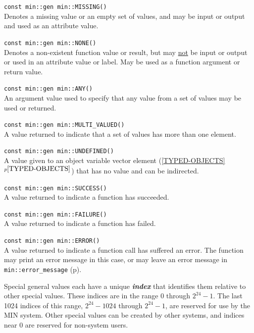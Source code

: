 \documentclass[12pt]{article}
\makeatletter
\newcommand{\ikey}[2]{{\bf \em #1}\index{#2}}
\newcommand{\ttindex}[1]{\index{#1@{\tt #1}}}
\newcommand{\minindex}[1]{\ttindex{min::#1}\ttindex{#1}}
\newcommand{\itemref}[1]{\ref{#1}$^{p\pageref{#1}}$}
\newcommand{\pagref}[1]{p\pageref{#1}}
\newcommand{\EOL}{\penalty \exhyphenpenalty}
\newenvironment{indpar}[1][0.3in]%
	{\begin{list}{}%
		     {\setlength{\itemsep}{0in}%
		      \setlength{\topsep}{0in}%
		      \setlength{\parsep}{1ex}%
		      \setlength{\labelwidth}{#1}%
		      \setlength{\leftmargin}{#1}%
		      \addtolength{\leftmargin}{\labelsep}}%
	 \item}%
	{\end{list}}
\newcommand{\LABEL}[1]{\label{#1}}
\newcommand{\MINNBKEY}[1]{{\tt #1}\minindex{#1}}
\makeatother
\begin{document}
\begin{indpar}
\begin{list}{}{}
\item[{\tt const min::gen min::}\MINNBKEY{MISSING()}]~%
	\LABEL{MIN::MISSING}\\
Denotes a missing value or an empty set of values, and may be input
or output and used as an attribute value.
\item[{\tt const min::gen min::}\MINNBKEY{NONE()}]~%
	\LABEL{MIN::NONE}\\
Denotes a non-existent function value or result, but may \underline{not} be
input or output or used in an attribute value or label.  May be used
as a function argument or return value.
\item[{\tt const min::gen min::}\MINNBKEY{ANY()}]~%
	\LABEL{MIN::ANY}\\
An argument value used to specify that any value from a set of values may be
used or returned.
\item[{\tt const min::gen min::}\MINNBKEY{MULTI\_VALUED()}]~%
	\LABEL{MIN::MULTI_VALUED}\\
A value returned to indicate that
a set of values has more than one element.
\item[{\tt const min::gen min::}\MINNBKEY{UNDEFINED()}]~%
	\LABEL{MIN::UNDEFINED}\\
A value given to an object variable vector element
(\itemref{TYPED-OBJECTS}) that has no value and can be indirected.
\item[{\tt const min::gen min::}\MINNBKEY{SUCCESS()}]~%
	\LABEL{MIN::SUCCESS}\\
A value returned to indicate a function has succeeded.
\item[{\tt const min::gen min::}\MINNBKEY{FAILURE()}]~%
	\LABEL{MIN::FAILURE}\\
A value returned to indicate a function has failed.
\item[{\tt const min::gen min::}\MINNBKEY{ERROR()}]~%
	\LABEL{MIN::ERROR}\\
A value returned to indicate a function call has suffered an error.
The function may print an error message in
this case, or may leave an error message in
{\tt min::\EOL error\_\EOL message} (\pagref{ERROR_MESSAGE}).
\end{list}
\end{indpar}

Special general values each have a unique \ikey{index}{of special value}
that identifies them relative to other special values.  These
indices are in the range $0$ through $2^{24}-1$.  The last 1024 indices of this
range, $2^{24}-1024$ through $2^{24}-1$, are reserved for use by the MIN
system.  Other special values can be created by other systems,
and indices near 0 are reserved for non-system users.
\end{document}
